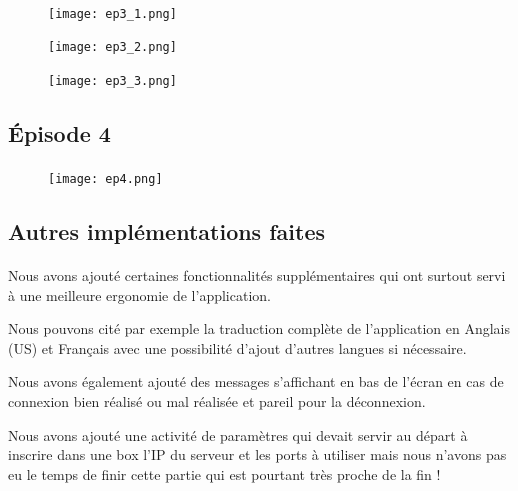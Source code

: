 \documentclass[a4paper,12pt]{report}
\begin{document}
			\paragraph*{}
			
			\begin{figure}[H]
				\centering
					\texttt{[image: ep3\_1.png]}
				\label{ep1}
			\end{figure}
			
			\begin{figure}[H]
				\centering
					\texttt{[image: ep3\_2.png]}
				\label{ep1}
			\end{figure}
			
			\begin{figure}[H]
				\centering
					\texttt{[image: ep3\_3.png]}
				\label{ep1}
			\end{figure}
		
		
		\subsection{Épisode 4}
			\paragraph*{}
			
			\begin{figure}[H]
				\centering
					\texttt{[image: ep4.png]}
				\label{ep1}
			\end{figure}
		
		
		\subsection{Autres implémentations faites}
			\paragraph*{}
			Nous avons ajouté certaines fonctionnalités supplémentaires qui ont surtout servi à une meilleure ergonomie de l'application.
			
			Nous pouvons cité par exemple la traduction complète de l'application en Anglais (US) et Français avec une possibilité d'ajout d'autres langues si nécessaire.
			
			Nous avons également ajouté des messages s'affichant en bas de l'écran en cas de connexion bien réalisé ou mal réalisée et pareil pour la déconnexion.
			
			Nous avons ajouté une activité de paramètres qui devait servir au départ à inscrire dans une box l'IP du serveur et les ports à utiliser mais nous n'avons pas eu le temps de finir cette partie qui est pourtant très proche de la fin !
			
\end{document}
